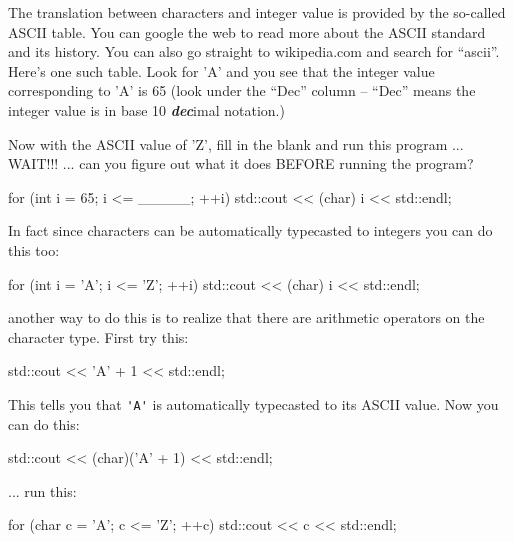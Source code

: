 The translation between characters and integer value is provided by the
so-called ASCII table. You can google the web to read more about the
ASCII standard and its history. You can also go straight to
wikipedia.com and search for ``ascii''. Here's one such
table. Look for 'A' and you see that
the integer value corresponding to 'A'
is 65 (look under the ``Dec'' column -- ``Dec'' means the integer value
is in base 10 \textbf{\textit{dec}}imal notation.)



Now with the ASCII value of 'Z', fill in the blank and run this program ... WAIT!!! ... can you figure out what it does BEFORE running the program?

\begin{consolethree}[escapeinside=||]
for (int i = 65; i <= _____; ++i)
{
    std::cout << (char) i << std::endl;
}
\end{consolethree}

In fact since characters can be automatically typecasted to integers you can do this too:

\begin{consolethree}[escapeinside=||]
for (int i = 'A'; i <= 'Z'; ++i)
{
    std::cout << (char) i << std::endl;
}
\end{consolethree}


 another way to do this is to realize that there are arithmetic operators on the character type. First try this:

\begin{consolethree}[escapeinside=||]
std::cout << 'A' + 1 << std::endl;
\end{consolethree}

This tells you that \verb!'A'! is automatically typecasted to its ASCII value. Now you can do this:

\begin{consolethree}[escapeinside=||]
std::cout << (char)('A' + 1) << std::endl;
\end{consolethree}

 ... run this:

\begin{consolethree}[escapeinside=||]
for (char c = 'A'; c <= 'Z'; ++c)
{
    std::cout << c << std::endl;
}
\end{consolethree}

